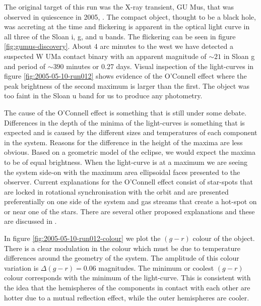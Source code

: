   
The original target of this run was the X-ray transient, {GU Mus}, that was observed in quiescence in 2005, \citep{tariq2010}. The compact object, thought to be a black hole, was accreting at the time and flickering is apparent in the optical light curve in all three of the Sloan i, g, and u bands. The flickering can be seen in figure \ref{fig:gumus-discovery}. About 4 arc minutes to the west we have detected a suspected {W UMa} contact binary with an apparent magnitude of $\sim21$ in Sloan g and period of $\sim 390$ minutes or 0.27 days. Visual inspection of the light-curves in figure \ref{fig:2005-05-10-run012} shows evidence of the O'Connell effect where the peak brightness of the second maximum is larger than the first. The object was too faint in the Sloan u band for us to produce any photometry. 

The cause of the O'Connell effect is something that is still under some debate. Differences in the depth of the minima of the light-curves is something that is expected and is caused by the different sizes and temperatures of each component in the system. Reasons for the difference in the height of the maxima are less obvious. Based on a geometric model of the eclipse, we would expect the maxima to be of equal brightness. When the light-curve is at a maximum we are seeing the system side-on with the maximum area ellipsoidal faces presented to the observer. Current explanations for the O'Connell effect consist of star-spots that are locked in rotational synchronisation with the orbit and are presented preferentially on one side of the system and gas streams that create a hot-spot on or near one of the stars. There are several other proposed explanations and these are discussed in \citet{oconnelleffect}.  

In figure \ref{fig:2005-05-10-run012-colour} we plot the $(g-r)$ colour of the object. There is a clear modulation in the colour which must be due to temperature differences around the geometry of the system. The amplitude of this colour variation is $\Delta(g-r) = 0.06$ magnitudes. The minimum or coolest $(g - r)$ colour corresponds with the minimum of the light-curve. This is consistent with the idea that the hemispheres of the components in contact with each other are hotter due to a mutual reflection effect, while the outer hemispheres are cooler. 

